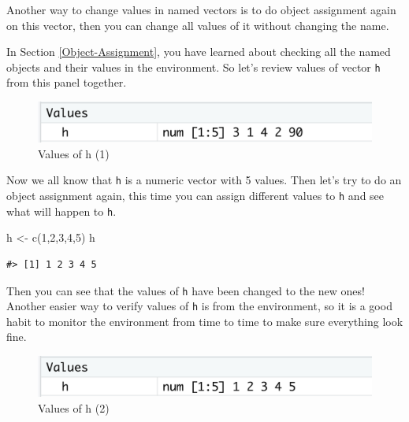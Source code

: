 \documentclass[
]{book}
\newenvironment{Shaded}{\begin{snugshade}}{\end{snugshade}}
\newcommand{\DecValTok}[1]{\textcolor[rgb]{0.00,0.00,0.81}{#1}}
\newcommand{\FunctionTok}[1]{\textcolor[rgb]{0.00,0.00,0.00}{#1}}
\newcommand{\NormalTok}[1]{#1}
\newcommand{\OtherTok}[1]{\textcolor[rgb]{0.56,0.35,0.01}{#1}}
\begin{document}
Another way to change values in named vectors is to do object assignment again on this vector, then you can change all values of it without changing the name.

In Section \ref{Object-Assignment}, you have learned about checking all the named objects and their values in the environment. So let's review values of vector \texttt{h} from this panel together.

\begin{figure}

{\centering \includegraphics[width=0.7\linewidth]{pics/2h1} 

}

\caption{Values of h (1)}\label{fig:h1}
\end{figure}

Now we all know that \texttt{h} is a numeric vector with 5 values. Then let's try to do an object assignment again, this time you can assign different values to \texttt{h} and see what will happen to \texttt{h}.

\begin{Shaded}
\begin{Highlighting}[]
\NormalTok{h }\OtherTok{\textless{}{-}} \FunctionTok{c}\NormalTok{(}\DecValTok{1}\NormalTok{,}\DecValTok{2}\NormalTok{,}\DecValTok{3}\NormalTok{,}\DecValTok{4}\NormalTok{,}\DecValTok{5}\NormalTok{)}
\NormalTok{h}
\end{Highlighting}
\end{Shaded}

\begin{verbatim}
#> [1] 1 2 3 4 5
\end{verbatim}

Then you can see that the values of \texttt{h} have been changed to the new ones! Another easier way to verify values of \texttt{h} is from the environment, so it is a good habit to monitor the environment from time to time to make sure everything look fine.

\begin{figure}

{\centering \includegraphics[width=0.7\linewidth]{pics/2h2} 

}

\caption{Values of h (2)}\label{fig:h2}
\end{figure}
\end{document}
